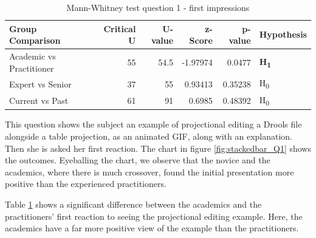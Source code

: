 \begin{table} 
    \begin{center}
        \begin{tabular}{ |l ||r |r |r | r|l | } 
            \hline
            Group Comparison                 & Critical U & U-value & z-Score  & p-value & Hypothesis         \\
            \hline
            \hline
            Academic vs Practitioner         & 55         & 54.5    & -1.97974 & 0.0477  & \textbf{H\textsubscript{1}}  \\ 
            \hline
            Expert vs Senior                 & 37         & 55      & 0.93413  & 0.35238 & H\textsubscript{0} \\ 
            \hline
            Current vs Past                  & 61         & 91      & 0.6985   & 0.48392 & H\textsubscript{0} \\ 
            \hline
        \end{tabular}
    \end{center}
    \caption{Mann-Whitney test question 1 - first impressions}
    \label{table:mannwhitneyQ1}
\end{table}

This question shows the subject an example of projectional editing a Drools file alongside a table projection, as an animated GIF, along with an explanation.
Then she is asked her first reaction. 
The chart in figure \ref{fig:stackedbar_Q1} shows the outcomes.
Eyeballing the chart, we observe that the novice and the academics, where there is much crossover, found the initial presentation more positive than the experienced practitioners.

Table \ref{table:mannwhitneyQ1} shows a significant difference between the academics and the practitioners' first reaction to seeing the projectional editing example.
Here, the academics have a far more positive view of the example than the practitioners.

